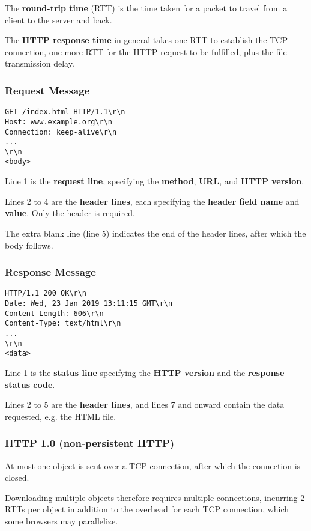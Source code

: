 The \textbf{round-trip time} (RTT) is the time taken for a packet to travel from a client to the server and back.

The \textbf{HTTP response time} in general takes one RTT to establish the TCP connection, one more RTT for the
HTTP request to be fulfilled, plus the file transmission delay.

\subsubsection{Request Message}
\begin{lstlisting}
GET /index.html HTTP/1.1\r\n
Host: www.example.org\r\n
Connection: keep-alive\r\n
...
\r\n
<body>
\end{lstlisting}

Line 1 is the \textbf{request line}, specifying the \textbf{method}, \textbf{URL}, and \textbf{HTTP version}.

Lines 2 to 4 are the \textbf{header lines}, each specifying the \textbf{header field name} and \textbf{value}.
Only the  header is required.

The extra blank line (line 5) indicates the end of the header lines, after which the body follows.

\subsubsection{Response Message}
\begin{lstlisting}
HTTP/1.1 200 OK\r\n
Date: Wed, 23 Jan 2019 13:11:15 GMT\r\n
Content-Length: 606\r\n
Content-Type: text/html\r\n
...
\r\n
<data>
\end{lstlisting}

Line 1 is the \textbf{status line} specifying the \textbf{HTTP version} and the \textbf{response status code}.

Lines 2 to 5 are the \textbf{header lines}, and lines 7 and onward contain the data requested, e.g. the HTML file.

\subsubsection{HTTP 1.0 (non-persistent HTTP)}
At most one object is sent over a TCP connection, after which the connection is closed.

Downloading multiple objects therefore requires multiple connections, incurring 2 RTTs per object in addition to the overhead for each TCP
connection, which some browsers may parallelize.

